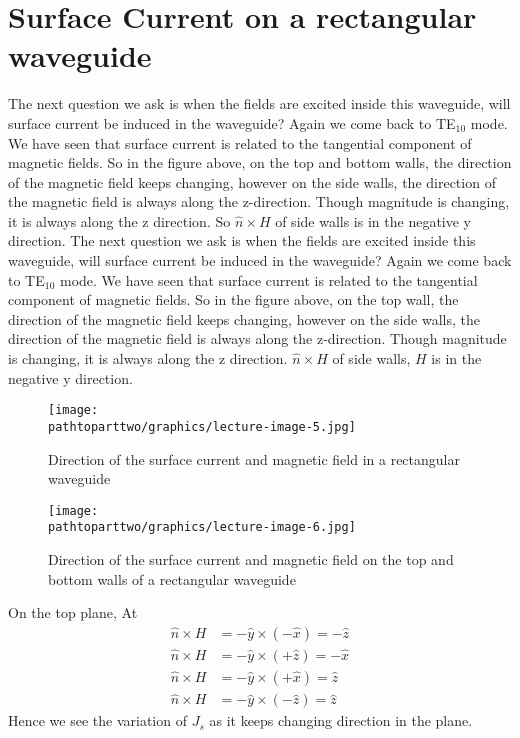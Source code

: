 \section{Surface Current on a rectangular waveguide}
The next question we ask is when the fields are excited inside this waveguide, will surface current be induced in the waveguide? Again we come back to TE$_{10}$ mode. We have seen that surface current is related to the tangential component of magnetic fields. So in the figure above, on the top and bottom walls, the direction of the magnetic field keeps changing, however on the side walls, the direction of the magnetic field is always along the z-direction. Though magnitude is changing, it is always along the z direction. So $\hat{n} \times H$ of side walls is in the negative y direction.
The next question we ask is when the fields are excited inside this waveguide, will surface current be induced in the waveguide? Again we come back to TE$_{10}$ mode. We have seen that surface current is related to the tangential component of magnetic fields. So in the figure above, on the top wall, the direction of the magnetic field keeps changing, however on the side walls, the direction of the magnetic field is always along the z-direction. Though magnitude is changing, it is always along the z direction. $\hat{n} \times H$ of side walls, $H$ is in the negative y direction.
\begin{figure}[h]
\centering
\texttt{[image: \\pathtoparttwo/graphics/lecture-image-5.jpg]}
\caption{Direction of the surface current and magnetic field in a rectangular waveguide}
\label{fig:lectureimage5}
\end{figure}
\begin{figure}[h]
\centering
\texttt{[image: \\pathtoparttwo/graphics/lecture-image-6.jpg]}
\caption{Direction of the surface current and magnetic field on the top and bottom walls of a rectangular waveguide}
\label{fig:lectureimage6}
\end{figure}

On the top plane, At
\begin{align*}
\hat{n} \times H &= -\hat{y} \times (-\hat{x})= -\hat{z}\\
\hat{n} \times H &= -\hat{y} \times (+\hat{z})= -\hat{x}\\
\hat{n} \times H &= -\hat{y} \times (+\hat{x})= \hat{z}\\
\hat{n} \times H &= -\hat{y} \times (-\hat{z})= \hat{z}
\end{align*}
Hence we see the variation of $J_{s}$ as it keeps changing direction in the plane.

